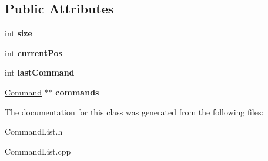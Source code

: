 \subsection*{Public Attributes}
\begin{DoxyCompactItemize}
\item 
\hypertarget{class_command_list_adc77c49a4c604cdd32bd77ad1ee89ff6}{}int {\bfseries size}\label{class_command_list_adc77c49a4c604cdd32bd77ad1ee89ff6}

\item 
\hypertarget{class_command_list_a58ea031961578de2c50b8c0fb6f5ce31}{}int {\bfseries current\+Pos}\label{class_command_list_a58ea031961578de2c50b8c0fb6f5ce31}

\item 
\hypertarget{class_command_list_a076cd854c00450cc01218c168c01af0e}{}int {\bfseries last\+Command}\label{class_command_list_a076cd854c00450cc01218c168c01af0e}

\item 
\hypertarget{class_command_list_ae51735999a6d1f60ed22c70ae68d6482}{}\hyperlink{class_command}{Command} $\ast$$\ast$ {\bfseries commands}\label{class_command_list_ae51735999a6d1f60ed22c70ae68d6482}

\end{DoxyCompactItemize}


The documentation for this class was generated from the following files\+:\begin{DoxyCompactItemize}
\item 
Command\+List.\+h\item 
Command\+List.\+cpp\end{DoxyCompactItemize}
